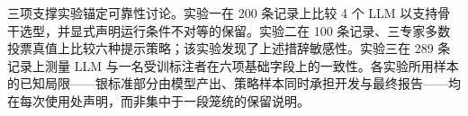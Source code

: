 \documentclass[11pt]{article}
\begin{document}
{\cjkfont 三\allowbreak 项\allowbreak 支\allowbreak 撑\allowbreak 实\allowbreak 验\allowbreak 锚\allowbreak 定\allowbreak 可\allowbreak 靠\allowbreak 性\allowbreak 讨\allowbreak 论\allowbreak 。\allowbreak 实\allowbreak 验\allowbreak 一\allowbreak 在} 200 {\cjkfont 条\allowbreak 记\allowbreak 录\allowbreak 上\allowbreak 比\allowbreak 较} 4 {\cjkfont 个} LLM {\cjkfont 以\allowbreak 支\allowbreak 持\allowbreak 骨\allowbreak 干\allowbreak 选\allowbreak 型\allowbreak ，\allowbreak 并\allowbreak 显\allowbreak 式\allowbreak 声\allowbreak 明\allowbreak 运\allowbreak 行\allowbreak 条\allowbreak 件\allowbreak 不\allowbreak 对\allowbreak 等\allowbreak 的\allowbreak 保\allowbreak 留\allowbreak 。\allowbreak 实\allowbreak 验\allowbreak 二\allowbreak 在} 100 {\cjkfont 条\allowbreak 记\allowbreak 录\allowbreak 、\allowbreak 三\allowbreak 专\allowbreak 家\allowbreak 多\allowbreak 数\allowbreak 投\allowbreak 票\allowbreak 真\allowbreak 值\allowbreak 上\allowbreak 比\allowbreak 较\allowbreak 六\allowbreak 种\allowbreak 提\allowbreak 示\allowbreak 策\allowbreak 略\allowbreak ；\allowbreak 该\allowbreak 实\allowbreak 验\allowbreak 发\allowbreak 现\allowbreak 了\allowbreak 上\allowbreak 述\allowbreak 措\allowbreak 辞\allowbreak 敏\allowbreak 感\allowbreak 性\allowbreak 。\allowbreak 实\allowbreak 验\allowbreak 三\allowbreak 在} 289 {\cjkfont 条\allowbreak 记\allowbreak 录\allowbreak 上\allowbreak 测\allowbreak 量} LLM {\cjkfont 与\allowbreak 一\allowbreak 名\allowbreak 受\allowbreak 训\allowbreak 标\allowbreak 注\allowbreak 者\allowbreak 在\allowbreak 六\allowbreak 项\allowbreak 基\allowbreak 础\allowbreak 字\allowbreak 段\allowbreak 上\allowbreak 的\allowbreak 一\allowbreak 致\allowbreak 性\allowbreak 。\allowbreak 各\allowbreak 实\allowbreak 验\allowbreak 所\allowbreak 用\allowbreak 样\allowbreak 本\allowbreak 的\allowbreak 已\allowbreak 知\allowbreak 局\allowbreak 限}------{\cjkfont 银\allowbreak 标\allowbreak 准\allowbreak 部\allowbreak 分\allowbreak 由\allowbreak 模\allowbreak 型\allowbreak 产\allowbreak 出\allowbreak 、\allowbreak 策\allowbreak 略\allowbreak 样\allowbreak 本\allowbreak 同\allowbreak 时\allowbreak 承\allowbreak 担\allowbreak 开\allowbreak 发\allowbreak 与\allowbreak 最\allowbreak 终\allowbreak 报\allowbreak 告}------{\cjkfont 均\allowbreak 在\allowbreak 每\allowbreak 次\allowbreak 使\allowbreak 用\allowbreak 处\allowbreak 声\allowbreak 明\allowbreak ，\allowbreak 而\allowbreak 非\allowbreak 集\allowbreak 中\allowbreak 于\allowbreak 一\allowbreak 段\allowbreak 笼\allowbreak 统\allowbreak 的\allowbreak 保\allowbreak 留\allowbreak 说\allowbreak 明\allowbreak 。}
\end{document}
